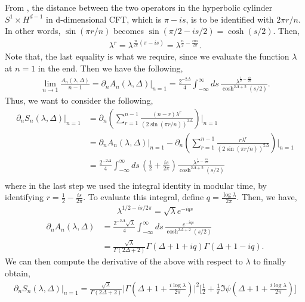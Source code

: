 \documentclass[11pt]{article}
\newcommand{\p}{\partial}
\newcommand{\lb}{\left(}
\newcommand{\rb}{\right)}
\begin{document}
From \cite{S_rosi_2018}, the distance between the two operators in the hyperbolic cylinder $S^1 \times H^{d-1}$ in d-dimensional CFT, which is $\pi - is$, is to be identified with $2\pi r/n$. In other words, $\sin (\pi r/n) $ becomes $\sin( \pi /2 - is/2) = \cosh(s/2)$. Then, 
\begin{align}
    \lambda^r = \lambda^{\frac{n}{2\pi}(\pi - is)} = \lambda^{\frac{n}{2}-\frac{i n s}{2\pi}}.
\end{align}
Note that, the last equality is what we require, since we evaluate the function $\lambda$ at $n=1$ in the end.
Then we have the following,
\begin{align}
    \lim_{n\to1} \frac{A_n(\lambda,\Delta)}{n-1} = \p_n A_n(\lambda,\Delta)|_{n=1} =  \frac{2^{-2\Delta}}{4}\int_{-\infty}^\infty ds \, \frac{\lambda^{\frac{1}{2}- \frac{is}{2\pi}}}{\cosh^{2\Delta +2}(s/2)}.
\end{align}
Thus, we want to consider the following,
\begin{align}
    \p_n S_{n}(\lambda,\Delta)|_{n=1} &= \p_n \lb \sum_{r=1}^{n-1} \frac{(n-r)\lambda^r }{\lb 2\sin(\pi r/n)\rb^{2\Delta}}\rb\Bigg|_{n=1}
    \\&= \p_nA_n(\lambda,\Delta)|_{n=1} - \p_n\lb\sum_{r=1}^{n-1}\frac{r\lambda^r}{\lb 2\sin(\pi r/n)\rb^{2\Delta}}\rb\Bigg|_{n=1}\\
    &= \frac{2^{-2\Delta}}{4}\int_{-\infty}^\infty ds\, \lb\frac{1}{2}+ \frac{is}{2\pi}\rb\frac{\lambda^{\frac{1}{2}- \frac{is}{2\pi}}}{\cosh^{2\Delta +2}(s/2)}\\
\end{align}
where in the last step we used the integral identity in modular time, by identifying $r = \frac{1}{2} - \frac{is}{2\pi}$. To evaluate this integral, define $q = \frac{\log \lambda}{2\pi}$. Then, we have,
\begin{align}
    \lambda^{1/2 - is/2\pi} =\sqrt \lambda e^{-iqs}
\end{align}
\begin{align}
    \p_nA_n(\lambda,\Delta) &= \frac{2^{-2\Delta}\sqrt \lambda}{4} \int_{-\infty}^\infty ds \,  \frac{e^{-iqs}}{\cosh^{2\Delta + 2}(s/2)} \\&= \frac{\sqrt{\lambda}}{\Gamma(2\Delta +2)} \Gamma(\Delta + 1 + iq) \Gamma(\Delta + 1 -iq).
\end{align}
We can then compute the derivative of the above with respect to $\lambda$ to finally obtain,
\begin{align}
    \boxed{\p_n S_n(\lambda, \Delta)|_{n=1} = \frac{\sqrt{\lambda}}{\Gamma(2\Delta +2)} \Bigg|\Gamma\lb \Delta + 1 +\frac{i\log \lambda }{2\pi}\rb\Bigg|^2\Bigg[\frac{1}{2}+ \frac{1}{\pi} \Im \psi\lb\Delta + 1 + \frac{i\log \lambda}{2\pi}\rb\Bigg]
    }
\end{align}
\end{document}
